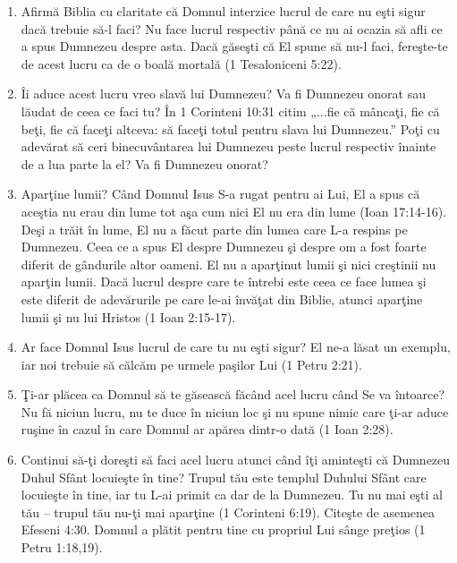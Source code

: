 \begin{enumerate}

	\item Afirmă Biblia cu claritate că Domnul interzice lucrul de care nu eşti sigur dacă trebuie să-l faci? Nu face lucrul respectiv până ce nu ai ocazia să afli ce a spus Dumnezeu despre asta. Dacă găseşti că El spune să nu-l faci, fereşte-te de acest lucru ca de o boală mortală (1 Tesaloniceni 5:22).
	
	\item Îi aduce acest lucru vreo slavă lui Dumnezeu? Va fi Dumnezeu onorat sau lăudat de ceea ce faci tu? În 1 Corinteni 10:31 citim „...fie că mâncaţi, fie că beţi, fie că faceţi altceva: să faceţi totul pentru slava lui Dumnezeu.” Poţi cu adevărat să ceri binecuvântarea lui Dumnezeu peste lucrul respectiv înainte de a lua parte la el? Va fi Dumnezeu onorat?
	
	\item Aparţine lumii? Când Domnul Isus S-a rugat pentru ai Lui, El a spus că aceştia nu erau din lume tot aşa cum nici El nu era din lume (Ioan 17:14-16). Deşi a trăit în lume, El nu a făcut parte din lumea care L-a respins pe Dumnezeu. Ceea ce a spus El despre Dumnezeu şi despre om a fost foarte diferit de gândurile altor oameni. El nu a aparţinut lumii şi nici creştinii nu aparţin lumii. Dacă lucrul despre care te întrebi este ceea ce face lumea şi este diferit de adevărurile pe care le-ai învăţat din Biblie, atunci aparţine lumii şi nu lui Hristos (1 Ioan 2:15-17).
	
	\item Ar face Domnul Isus lucrul de care tu nu eşti sigur? El ne-a lăsat un exemplu, iar noi trebuie să călcăm pe urmele paşilor Lui (1 Petru 2:21).
	
	\item Ţi-ar plăcea ca Domnul să te găsească făcând acel lucru când Se va întoarce? Nu fă niciun lucru, nu te duce în niciun loc şi nu spune nimic care ţi-ar aduce ruşine în cazul în care Domnul ar apărea dintr-o dată (1 Ioan 2:28).
	
	\item Continui să-ţi doreşti să faci acel lucru atunci când îţi aminteşti că Dumnezeu Duhul Sfânt locuieşte în tine? Trupul tău este templul Duhului Sfânt care locuieşte în tine, iar tu L-ai primit ca dar de la Dumnezeu. Tu nu mai eşti al tău – trupul tău nu-ţi mai aparţine (1 Corinteni 6:19). Citeşte de asemenea Efeseni 4:30. Domnul a plătit pentru tine cu propriul Lui sânge preţios (1 Petru 1:18,19).
	

\end{enumerate}
